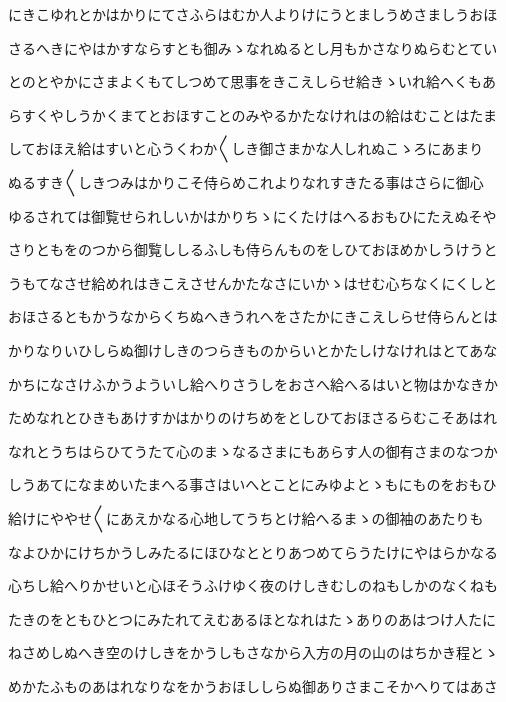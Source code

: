 \documentclass[a4paper,11pt,landscape]{ltjtarticle}
\begin{document}
\par\medskip
にきこゆれとかはかりにてさふらはむか人よりけにうとましうめさましうおほ
\par\medskip
さるへきにやはかすならすとも御みゝなれぬるとし月もかさなりぬらむとてい
\par\medskip
とのとやかにさまよくもてしつめて思事をきこえしらせ給きゝいれ給へくもあ
\par\medskip
らすくやしうかくまてとおほすことのみやるかたなけれはの給はむことはたま
\par\medskip
しておほえ給はすいと心うくわか〱しき御さまかな人しれぬこゝろにあまり
\par\medskip
ぬるすき〱しきつみはかりこそ侍らめこれよりなれすきたる事はさらに御心
\par\medskip
ゆるされては御覧せられしいかはかりちゝにくたけはへるおもひにたえぬそや
\par\medskip
さりともをのつから御覧ししるふしも侍らんものをしひておほめかしうけうと
\par\medskip
うもてなさせ給めれはきこえさせんかたなさにいかゝはせむ心ちなくにくしと
\par\medskip
おほさるともかうなからくちぬへきうれへをさたかにきこえしらせ侍らんとは
\par\medskip
かりなりいひしらぬ御けしきのつらきものからいとかたしけなけれはとてあな
\par\medskip
かちになさけふかうよういし給へりさうしをおさへ給へるはいと物はかなきか
\par\medskip
ためなれとひきもあけすかはかりのけちめをとしひておほさるらむこそあはれ
\par\medskip
なれとうちはらひてうたて心のまゝなるさまにもあらす人の御有さまのなつか
\par\medskip
しうあてになまめいたまへる事さはいへとことにみゆよとゝもにものをおもひ
\par\medskip
給けにややせ〱にあえかなる心地してうちとけ給へるまゝの御袖のあたりも
\par\medskip
なよひかにけちかうしみたるにほひなととりあつめてらうたけにやはらかなる
\par\medskip
心ちし給へりかせいと心ほそうふけゆく夜のけしきむしのねもしかのなくねも
\par\medskip
たきのをともひとつにみたれてえむあるほとなれはたゝありのあはつけ人たに
\par\medskip
ねさめしぬへき空のけしきをかうしもさなから入方の月の山のはちかき程とゝ
\par\medskip
めかたふものあはれなりなをかうおほししらぬ御ありさまこそかへりてはあさ
\par\medskip
\end{document}
